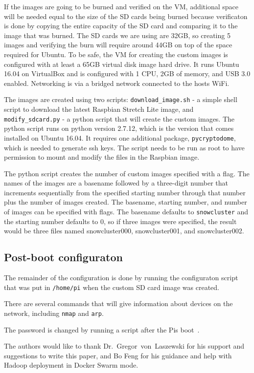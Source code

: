 If the images are going to be burned and verified on the VM,
additional space will be needed equal to the size of the SD cards
being burned because verificaton is done by copying the entire
capacity of the SD card and comparing it to the image that was
burned. The SD cards we are using are 32GB, so creating 5 images and
verifying the burn will require around 44GB on top of the space
required for Ubuntu. To be safe, the VM for creating the custom images
is configured with at least a 65GB virtual disk image hard drive.  It
runs Ubuntu 16.04 on VirtualBox and is configured with 1 CPU, 2GB of
memory, and USB 3.0 enabled. Networking is via a bridged network
connected to the hosts WiFi.

The images are created using two scripts: \verb|download_image.sh| - a
simple shell script to download the latest Raspbian Stretch Lite
image, and \verb|modify_sdcard.py| - a python script that will create
the custom images. The python script runs on python version 2.7.12,
which is the version that comes installed on Ubuntu 16.04. It requires
one additional package, \verb|pycryptodome|, which is needed to
generate ssh keys. The script needs to be run as root to have
permission to mount and modify the files in the Raspbian image.

The python script creates the number of custom images specified with a
flag. The names of the images are a basename followed by a three-digit
number that increments sequentially from the specified starting number
through that number plus the number of images created. The basename,
starting number, and number of images can be specified with flags. The
basename defaults to \verb|snowcluster| and the starting number
defaults to 0, so if three images were specified, the result would be
three files named snowcluster000, snowcluster001, and snowcluster002.

\subsection{Post-boot configuraton}
The remainder of the configuration is done by running the configuraton
script that was put in \verb|/home/pi| when the custom SD card image
was created.

There are several commands that will give information about devices on
the network, including \verb|nmap| and \verb|arp|.

The password is changed by running a script after the Pis
boot~\cite{hid-sp18-419-so-password}.

\begin{acks}

  The authors would like to thank Dr.~Gregor~von~Laszewski for his
  support and suggestions to write this paper, and Bo Feng for his guidance 
  and help with Hadoop deployment in Docker Swarm mode.

\end{acks}




